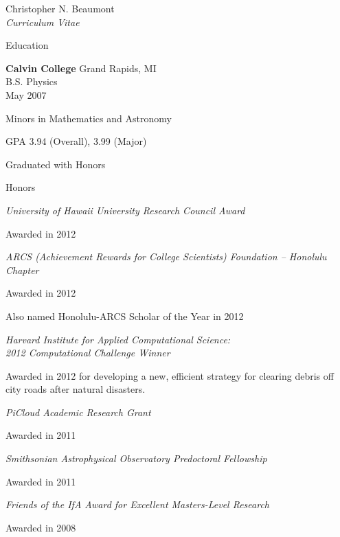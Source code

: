 \documentclass[10pt]{article}
\newenvironment{sublist}{%
	\begin{list}{}{%
		\setlength{\itemsep}{0em}\setlength{\parsep}{0em}%
		\setlength{\topsep}{0em}\setlength{\parskip}{0em}%
	}%
}%
{ \end{list} }
\begin{document}
\begin{cv}{Christopher N. Beaumont\\{\large \itshape Curriculum Vitae}}
\begin{cvlist}{Education}
	\item \textbf{Calvin College} Grand Rapids, MI\\
	B.S. Physics\\
	May 2007
	\begin{sublist}
		\item Minors in Mathematics and Astronomy
		\item GPA 3.94 (Overall), 3.99 (Major)
		\item Graduated with Honors
	\end{sublist}
\end{cvlist}

\begin{cvlist}{Honors}

\item
	\emph{University of Hawaii University Research Council Award}
	\begin{sublist}
	\item Awarded in 2012
	\end{sublist}

\item
	\emph{ARCS (Achievement Rewards for College Scientists) Foundation -- Honolulu Chapter}
	\begin{sublist}
	\item Awarded in 2012
	\item Also named Honolulu-ARCS Scholar of the Year in 2012
	\end{sublist}
\item
       \emph{Harvard Institute for Applied Computational Science: \\ 2012 Computational Challenge Winner}
        \begin{sublist}
        \item Awarded in 2012 for developing a new, efficient strategy for clearing debris off city roads after natural disasters.
        \end{sublist}
\item
	\emph{PiCloud Academic Research Grant}
	\begin{sublist}
	\item Awarded in 2011
	\end{sublist}
\item
	\emph{Smithsonian Astrophysical Observatory Predoctoral Fellowship}
	\begin{sublist}
	\item Awarded in 2011
	\end{sublist}
\item
	\emph{Friends of the IfA Award for Excellent Masters-Level Research}
	\begin{sublist}
	\item Awarded in 2008
	\end{sublist}


\end{cvlist}
\end{cv}
\end{document}
